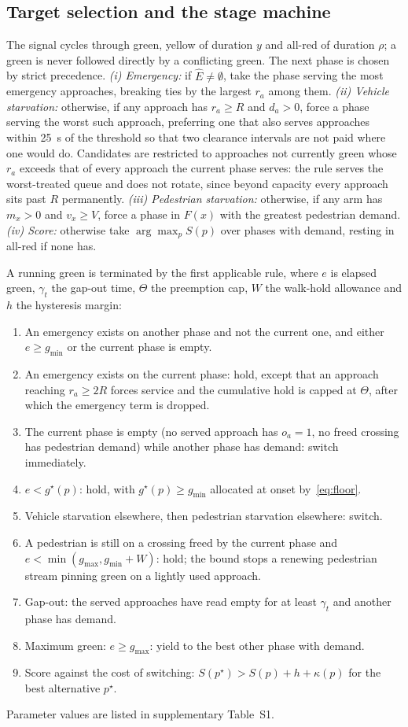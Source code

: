 \documentclass[journal]{IEEEtran}
\begin{document}
\subsection{Target selection and the stage machine}

The signal cycles through green, yellow of duration $y$ and all-red of duration $\rho$; a green is never
followed directly by a conflicting green. The next phase is chosen by strict precedence. \emph{(i) Emergency:}
if $\hat{E} \neq \emptyset$, take the phase serving the most emergency approaches, breaking ties by the largest
$r_a$ among them. \emph{(ii) Vehicle starvation:} otherwise, if any approach has $r_a \geq R$ and $d_a > 0$,
force a phase serving the worst such approach, preferring one that also serves approaches within 25~s of the
threshold so that two clearance intervals are not paid where one would do. Candidates are restricted to approaches not currently green whose $r_a$ exceeds that of every approach the
current phase serves: the rule serves the worst-treated queue and does not rotate, since beyond capacity
every approach sits past $R$ permanently. \emph{(iii) Pedestrian
starvation:} otherwise, if any arm has $m_x > 0$ and $v_x \geq V$, force a phase in $F(x)$ with the greatest
pedestrian demand. \emph{(iv) Score:} otherwise take $\arg\max_p S(p)$ over phases with demand, resting in
all-red if none has.

A running green is terminated by the first applicable rule, where $e$ is elapsed green, $\gamma_t$ the gap-out
time, $\Theta$ the preemption cap, $W$ the walk-hold allowance and $h$ the hysteresis margin:
\begin{enumerate}
\item An emergency exists on another phase and not the current one, and either $e \geq g_{\min}$ or the current
phase is empty.
\item An emergency exists on the current phase: hold, except that an approach reaching $r_a \geq 2R$ forces
service and the cumulative hold is capped at $\Theta$, after which the emergency term is dropped.
\item The current phase is empty (no served approach has $o_a = 1$, no freed crossing has pedestrian demand)
while another phase has demand: switch immediately.
\item $e < g^\star(p)$: hold, with $g^\star(p) \geq g_{\min}$ allocated at onset by~\eqref{eq:floor}.
\item Vehicle starvation elsewhere, then pedestrian starvation elsewhere: switch.
\item A pedestrian is still on a crossing freed by the current phase and $e < \min(g_{\max}, g_{\min} + W)$:
hold; the bound stops a renewing pedestrian stream pinning green on a lightly used approach.
\item Gap-out: the served approaches have read empty for at least $\gamma_t$ and another phase has demand.
\item Maximum green: $e \geq g_{\max}$: yield to the best other phase with demand.
\item Score against the cost of switching: $S(p^\star) > S(p) + h + \kappa(p)$ for the best alternative $p^\star$.
\end{enumerate}
Parameter values are listed in supplementary Table~S1.
\end{document}
